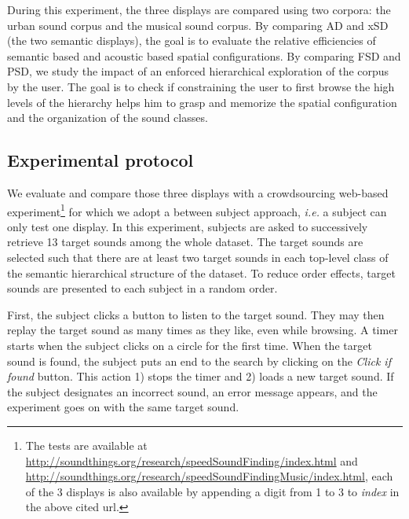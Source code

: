 \documentclass{aes2e}
\begin{document}
During this experiment, the three displays are compared using two corpora: the urban sound corpus and the musical sound corpus. By comparing AD and xSD (the two semantic displays), the goal is to evaluate the  relative efficiencies of semantic based and acoustic based spatial configurations. By comparing FSD and PSD, we study the impact of an enforced hierarchical exploration of the corpus by the user. The goal is to check if constraining the user to first browse the high levels of the hierarchy helps him to grasp and memorize the spatial configuration and the organization of the sound classes. 

\subsection{Experimental protocol}

We evaluate and compare those three displays with a crowdsourcing web-based experiment\footnote{The tests are available at \url{http://soundthings.org/research/speedSoundFinding/index.html} and \url{http://soundthings.org/research/speedSoundFindingMusic/index.html}, each of the 3 displays is also available by appending a digit from 1 to 3 to \textit{index} in the above cited url.} for which we adopt a between subject approach, \textit{i.e.} a subject can only test one display. In this experiment, subjects are asked to successively retrieve 13 target sounds among the whole dataset. The target sounds are selected such that there are at least two target sounds in each top-level class of the semantic hierarchical structure of the dataset. To reduce order effects, target sounds are presented to each subject in a random order.

First, the subject clicks a button to listen to the target sound. They may then replay the target sound as many times as they like, even while browsing. A timer starts when the subject clicks on a circle for the first time. When the target sound is found, the subject puts an end to the search by clicking on the \textit{Click if found} button. This action 1) stops the timer and 2) loads a new target sound. If the subject designates an incorrect sound, an error message appears, and the experiment goes on with the same target sound.


\end{document}
